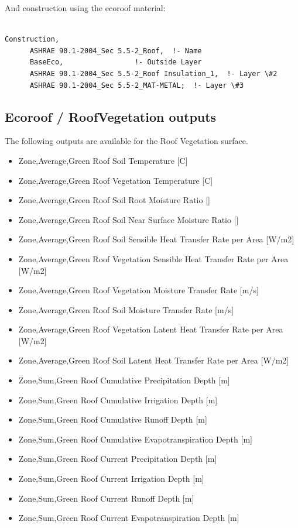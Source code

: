 And construction using the ecoroof material:

\begin{lstlisting}

Construction,
      ASHRAE 90.1-2004_Sec 5.5-2_Roof,  !- Name
      BaseEco,                 !- Outside Layer
      ASHRAE 90.1-2004_Sec 5.5-2_Roof Insulation_1,  !- Layer \#2
      ASHRAE 90.1-2004_Sec 5.5-2_MAT-METAL;  !- Layer \#3
\end{lstlisting}

\subsection{Ecoroof / RoofVegetation outputs}\label{ecoroof-roofvegetation-outputs}

The following outputs are available for the Roof Vegetation surface.

\begin{itemize}
\item
  Zone,Average,Green Roof Soil Temperature {[}C{]}
\item
  Zone,Average,Green Roof Vegetation Temperature {[}C{]}
\item
  Zone,Average,Green Roof Soil Root Moisture Ratio {[]}
\item
  Zone,Average,Green Roof Soil Near Surface Moisture Ratio {[]}
\item
  Zone,Average,Green Roof Soil Sensible Heat Transfer Rate per Area {[}W/m2{]}
\item
  Zone,Average,Green Roof Vegetation Sensible Heat Transfer Rate per Area {[}W/m2{]}
\item
  Zone,Average,Green Roof Vegetation Moisture Transfer Rate {[}m/s{]}
\item
  Zone,Average,Green Roof Soil Moisture Transfer Rate {[}m/s{]}
\item
  Zone,Average,Green Roof Vegetation Latent Heat Transfer Rate per Area {[}W/m2{]}
\item
  Zone,Average,Green Roof Soil Latent Heat Transfer Rate per Area {[}W/m2{]}
\item
  Zone,Sum,Green Roof Cumulative Precipitation Depth {[}m{]}
\item
  Zone,Sum,Green Roof Cumulative Irrigation Depth {[}m{]}
\item
  Zone,Sum,Green Roof Cumulative Runoff Depth {[}m{]}
\item
  Zone,Sum,Green Roof Cumulative Evapotranspiration Depth {[}m{]}
\item
  Zone,Sum,Green Roof Current Precipitation Depth {[}m{]}
\item
  Zone,Sum,Green Roof Current Irrigation Depth {[}m{]}
\item
  Zone,Sum,Green Roof Current Runoff Depth {[}m{]}
\item
  Zone,Sum,Green Roof Current Evapotranspiration Depth {[}m{]}
\end{itemize}

